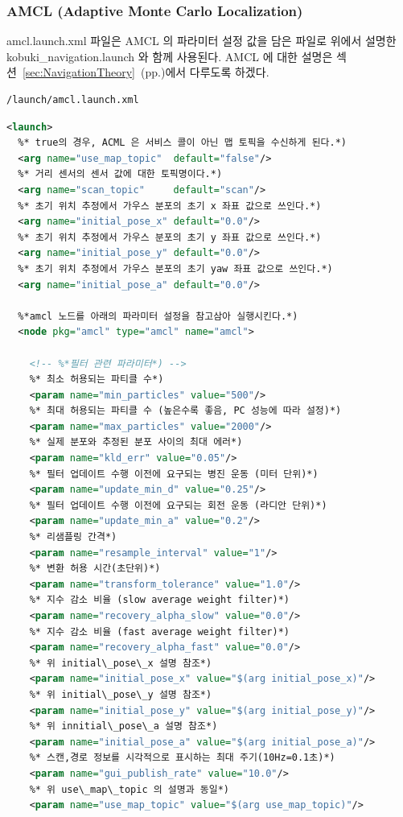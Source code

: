 \subsubsection{AMCL (Adaptive Monte Carlo Localization)}
amcl.launch.xml 파일은 AMCL 의 파라미터 설정 값을 담은 파일로 위에서 설명한 kobuki\_navigation.launch 와 함께 사용된다. AMCL 에 대한 설명은 섹션~\ref{sec:NavigationTheory}~(pp.\pageref{sec:NavigationTheory})에서 다루도록 하겠다.

\vspace{\baselineskip}
\begin{lstlisting}[language=ROS]
/launch/amcl.launch.xml
\end{lstlisting}

\vspace{\baselineskip}
\begin{lstlisting}[language=XML]
<launch>
  %* true의 경우, ACML 은 서비스 콜이 아닌 맵 토픽을 수신하게 된다.*)
  <arg name="use_map_topic"  default="false"/>
  %* 거리 센서의 센서 값에 대한 토픽명이다.*) 
  <arg name="scan_topic"     default="scan"/>
  %* 초기 위치 추정에서 가우스 분포의 초기 x 좌표 값으로 쓰인다.*)
  <arg name="initial_pose_x" default="0.0"/>
  %* 초기 위치 추정에서 가우스 분포의 초기 y 좌표 값으로 쓰인다.*)
  <arg name="initial_pose_y" default="0.0"/> 
  %* 초기 위치 추정에서 가우스 분포의 초기 yaw 좌표 값으로 쓰인다.*)
  <arg name="initial_pose_a" default="0.0"/> 

  %*amcl 노드를 아래의 파라미터 설정을 참고삼아 실행시킨다.*)
  <node pkg="amcl" type="amcl" name="amcl"> 

    <!-- %*필터 관련 파라미터*) -->
    %* 최소 허용되는 파티클 수*)
    <param name="min_particles" value="500"/> 
    %* 최대 허용되는 파티클 수 (높은수록 좋음, PC 성능에 따라 설정)*)
    <param name="max_particles" value="2000"/>
    %* 실제 분포와 추정된 분포 사이의 최대 에러*)
    <param name="kld_err" value="0.05"/>
    %* 필터 업데이트 수행 이전에 요구되는 병진 운동 (미터 단위)*)
    <param name="update_min_d" value="0.25"/>
    %* 필터 업데이트 수행 이전에 요구되는 회전 운동 (라디안 단위)*)
    <param name="update_min_a" value="0.2"/>
    %* 리샘플링 간격*)
    <param name="resample_interval" value="1"/>
    %* 변환 허용 시간(초단위)*)
    <param name="transform_tolerance" value="1.0"/>
    %* 지수 감소 비율 (slow average weight filter)*)
    <param name="recovery_alpha_slow" value="0.0"/>
    %* 지수 감소 비율 (fast average weight filter)*)
    <param name="recovery_alpha_fast" value="0.0"/> 
    %* 위 initial\_pose\_x 설명 참조*)
    <param name="initial_pose_x" value="$(arg initial_pose_x)"/>
    %* 위 initial\_pose\_y 설명 참조*)
    <param name="initial_pose_y" value="$(arg initial_pose_y)"/>
    %* 위 innitial\_pose\_a 설명 참조*)
    <param name="initial_pose_a" value="$(arg initial_pose_a)"/>
    %* 스캔,경로 정보를 시각적으로 표시하는 최대 주기(10Hz=0.1초)*)
    <param name="gui_publish_rate" value="10.0"/> 
    %* 위 use\_map\_topic 의 설명과 동일*)
    <param name="use_map_topic" value="$(arg use_map_topic)"/> 


\end{lstlisting}
